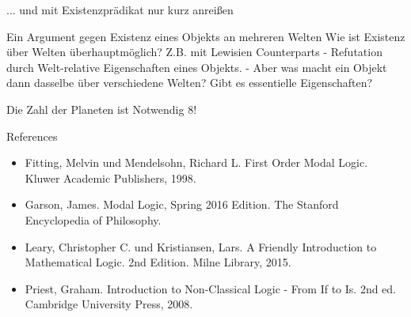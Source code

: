 \documentclass[12pt]{beamer}
\begin{document}
\begin{frame}{... und mit Existenzprädikat}
  nur kurz anreißen
\end{frame}

\begin{frame}{Ein Argument gegen Existenz eines Objekts an mehreren Welten}
  Wie ist Existenz über Welten überhauptmöglich?
  Z.B. mit Lewisien Counterparts
- Refutation durch Welt-relative Eigenschaften eines Objekts.
- Aber was macht ein Objekt dann dasselbe über verschiedene Welten? Gibt es essentielle Eigenschaften?
\end{frame}

\begin{frame}{Die Zahl der Planeten ist Notwendig 8!}
  
\end{frame}

\begin{frame}{References}
  
  \begin{itemize}
  \item Fitting, Melvin und Mendelsohn, Richard L. First Order Modal
    Logic. Kluwer Academic Publishers, 1998.
  \item Garson, James. Modal Logic, Spring 2016 Edition. The Stanford
    Encyclopedia of Philosophy.
  \item Leary, Christopher C. und Kristiansen, Lars. A Friendly
    Introduction to Mathematical Logic. 2nd Edition. Milne Library,
    2015.
  \item Priest, Graham. Introduction to Non-Classical Logic - From If
    to Is. 2nd ed. Cambridge University Press, 2008.

  \end{itemize}

\end{frame}
\end{document}
